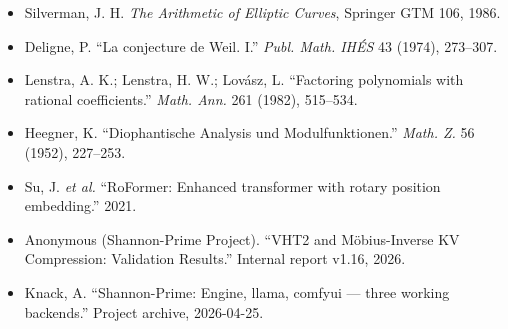 \documentclass[
  11pt,
]{article}
\providecommand{\tightlist}{%
  \setlength{\itemsep}{0pt}\setlength{\parskip}{0pt}}
\begin{document}
\begin{itemize}
\tightlist
\item
  Silverman, J. H. \emph{The Arithmetic of Elliptic Curves}, Springer
  GTM 106, 1986.
\item
  Deligne, P. ``La conjecture de Weil. I.'' \emph{Publ. Math. IHÉS} 43
  (1974), 273--307.
\item
  Lenstra, A. K.; Lenstra, H. W.; Lovász, L. ``Factoring polynomials
  with rational coefficients.'' \emph{Math. Ann.} 261 (1982), 515--534.
\item
  Heegner, K. ``Diophantische Analysis und Modulfunktionen.''
  \emph{Math. Z.} 56 (1952), 227--253.
\item
  Su, J. \emph{et al.} ``RoFormer: Enhanced transformer with rotary
  position embedding.'' 2021.
\item
  Anonymous (Shannon-Prime Project). ``VHT2 and Möbius-Inverse KV
  Compression: Validation Results.'' Internal report v1.16, 2026.
\item
  Knack, A. ``Shannon-Prime: Engine, llama, comfyui --- three working
  backends.'' Project archive, 2026-04-25.
\end{itemize}
\end{document}
